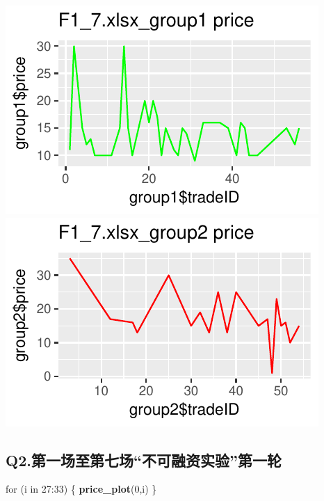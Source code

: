 \documentclass[]{article}
\newenvironment{Shaded}{\begin{snugshade}}{\end{snugshade}}
\newcommand{\KeywordTok}[1]{\textcolor[rgb]{0.13,0.29,0.53}{\textbf{{#1}}}}
\newcommand{\DecValTok}[1]{\textcolor[rgb]{0.00,0.00,0.81}{{#1}}}
\newcommand{\NormalTok}[1]{{#1}}
\begin{document}
\includegraphics{finance_homework_files/figure-latex/unnamed-chunk-3-13.pdf}
\includegraphics{finance_homework_files/figure-latex/unnamed-chunk-3-14.pdf}

\newpage

\subsection{\texorpdfstring{Q2.第一场至第七场``不可融资实验''第一轮}{Q2.第一场至第七场不可融资实验第一轮}}\label{q2.}

\begin{Shaded}
\begin{Highlighting}[]
\NormalTok{for (i in }\DecValTok{27}\NormalTok{:}\DecValTok{33}\NormalTok{) }
\NormalTok{\{}
  \KeywordTok{price_plot}\NormalTok{(}\DecValTok{0}\NormalTok{,i)}
\NormalTok{\}}
\end{Highlighting}
\end{Shaded}
\end{document}
